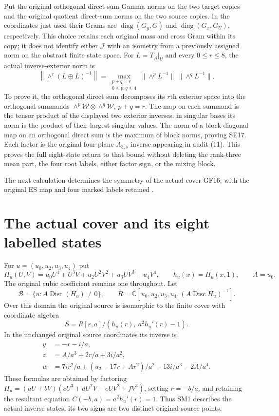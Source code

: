 \documentclass[11pt]{article}
\newcommand{\C}{\mathbb C}
\newcommand{\diag}{\operatorname{diag}}
\providecommand{\Disc}{\operatorname{Disc}}
\begin{document}
Put the original orthogonal direct-sum Gamma norms on the two target
copies and the original quotient direct-sum norms on the two source
copies. In the coordinates just used their Grams are
$\diag(G_y,G)$ and $\diag(G_x,G_U)$, respectively. This choice
retains each original mass and cross Gram within its copy; it does
not identify either $\mathcal J$ with an isometry from a previously
assigned norm on the abstract finite state space. For $L=T_A|_U$
and every $0\le r\le8$, the actual inverse-exterior norm is
\[
 \left\|\wedge^r(L\oplus L)^{-1}\right\|
 =\max_{\substack{p+q=r\\0\le p,q\le4}}
          \|\wedge^pL^{-1}\|\,\|\wedge^qL^{-1}\|.
 \tag{SE17}
\]
To prove it, the orthogonal direct sum decomposes its $r$th exterior
space into the orthogonal summands
$\wedge^p\mathcal W\otimes\wedge^q\mathcal W$, $p+q=r$.
The map on each summand is the tensor product of the displayed
two exterior inverses; in singular bases its norm is the product
of their largest singular values. The norm of a block diagonal
map on an orthogonal direct sum is the maximum of block norms,
proving SE17. Each factor is the original four-plane $A_{3,s}$
inverse appearing in audit (11). This proves the full eight-state
return to that bound without deleting the rank-three mean part,
the four root labels, either factor sign, or the mixing block.

\providecommand{\Disc}{\operatorname{Disc}}
\providecommand{\sgn}{\operatorname{sgn}}
\providecommand{\Aut}{\operatorname{Aut}}
The next calculation determines the symmetry of the actual cover GF16,
with the original ES map and four marked labels retained \cite{ES488}.

\section{The actual cover and its eight labelled states}
For $u=(u_0,u_2,u_3,u_4)$ put
\[
 H_u(U,V)=u_0U^4+U^3V+u_2U^2V^2+u_3UV^3+u_4V^4,
 \qquad h_u(x)=H_u(x,1),\qquad A=u_0.
\]
The original cubic coefficient remains one throughout. Let
\[
 \mathcal B=\{u:A\Disc(H_u)\ne0\},\qquad
 R=\C[u_0,u_2,u_3,u_4,(A\Disc H_u)^{-1}].
\]
Over this domain the original source is isomorphic to the finite
cover with coordinate algebra
\begin{equation}
 S=R[r,a]/(h_u(r),\ a^2h_u'(r)-1).\tag{SM1}
\end{equation}
In the unchanged original source coordinates its inverse is
\begin{align}
 y&=-r-i/a,\nonumber\\
 z&=A/a^3+2r/a+3i/a^2,\nonumber\\
 w&=7ir^2/a+(u_2-17r+Ar^2)/a^2-13i/a^3-2A/a^4.
 \tag{SM2}
\end{align}
These formulas are obtained by factoring
$H_u=(aU+bV)(cU^3+dU^2V+eUV^2+fV^3)$, setting $r=-b/a$,
and retaining the resultant equation
$C(-b,a)=a^2h_u'(r)=1$. Thus SM1 describes the actual inverse
states; its two signs are two distinct original source points.
\end{document}
